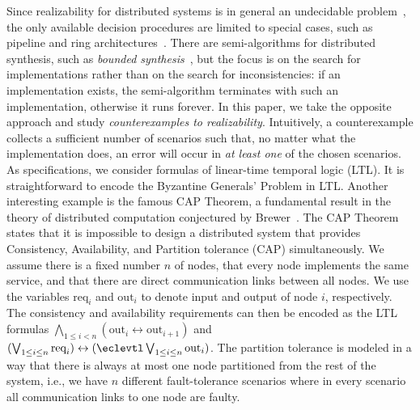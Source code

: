 \documentclass{LMCS}
\theoremstyle{plain}\newtheorem{theorem}[thm]{Theorem}
\theoremstyle{plain}\newtheorem{lemma}[thm]{Lemma}
\theoremstyle{plain}\newtheorem{proposition}[thm]{Proposition}
\theoremstyle{plain}\newtheorem{corollary}[thm]{Corollary}
\theoremstyle{definition}\newtheorem{definition}{Definition}[section]
\begin{document}
Since realizability for distributed systems is in general an undecidable problem~\cite{DBLP:conf/focs/PnueliR90}, the only available decision procedures are limited to special cases, such as pipeline and ring architectures~\cite{DBLP:conf/lics/KupfermanV01,DBLP:conf/lics/FinkbeinerS05}. There are semi-algorithms for distributed synthesis, such as \emph{bounded synthesis}~\cite{journals/sttt/FinkbeinerS13}, but the focus is on the search for implementations rather than on the search for inconsistencies: if an implementation exists, the semi-algorithm terminates with such an implementation, otherwise it runs forever.
In this paper, we take the opposite approach and study \emph{counterexamples to realizability}. Intuitively, a counterexample collects a sufficient number of scenarios such that, no matter what the implementation does, an error will occur in \emph{at least one} of the chosen scenarios. As specifications, we consider formulas of linear-time temporal logic (LTL). It is straightforward to encode the Byzantine Generals' Problem in LTL\@.
Another interesting example is the famous CAP Theorem, a fundamental result in the theory of distributed computation conjectured by Brewer~\cite{DBLP:conf/podc/Brewer00}. The CAP Theorem states that it is impossible to design a distributed system that provides Consistency, Availability, and Partition tolerance (CAP) simultaneously.
We assume there is a fixed number $n$ of nodes, that every node implements the same service, and that there are direct communication links between all nodes.
We use the variables $\text{req}_i$ and $\text{out}_i$ to denote input and output of node $i$, respectively.
The consistency and availability requirements can then be encoded as the LTL formulas $\bigwedge_{1 \leq i < n} (\text{out}_i \leftrightarrow \text{out}_{i+1})$ and $(\bigvee_{1 \leq i \leq n} \text{req}_i) \leftrightarrow (\eclevtl \bigvee_{1 \leq i \leq n} \text{out}_i)$.
The partition tolerance is modeled in a way that there is always at most one node partitioned from the rest of the system, i.e., we have $n$ different fault-tolerance scenarios where in every scenario all communication links to one node are faulty.
\end{document}
